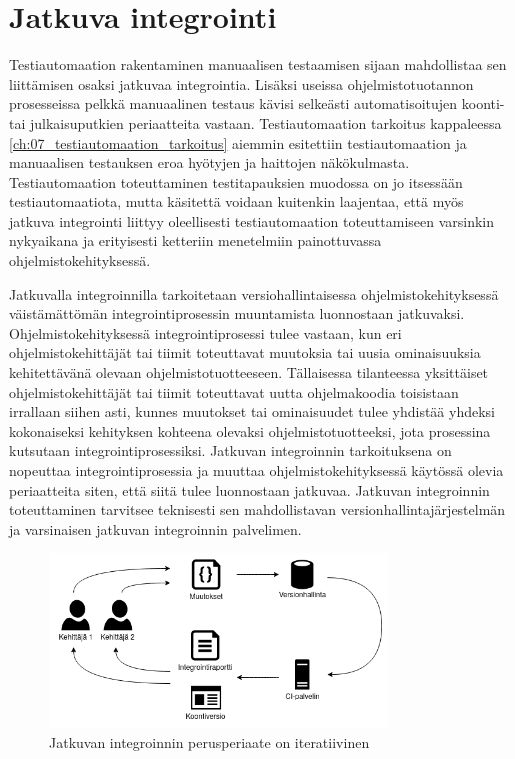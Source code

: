 \section{Jatkuva integrointi} \label{ch:07_jatkuva_integrointi}

  Testiautomaation rakentaminen manuaalisen testaamisen sijaan mahdollistaa sen liittämisen osaksi jatkuvaa integrointia.
  Lisäksi useissa ohjelmistotuotannon prosesseissa pelkkä manuaalinen testaus kävisi selkeästi automatisoitujen koonti- tai julkaisuputkien periaatteita vastaan.
  Testiautomaation tarkoitus kappaleessa \ref{ch:07_testiautomaation_tarkoitus} aiemmin esitettiin testiautomaation ja manuaalisen testauksen eroa hyötyjen ja haittojen näkökulmasta.
  Testiautomaation toteuttaminen testitapauksien muodossa on jo itsessään testiautomaatiota, mutta käsitettä voidaan kuitenkin laajentaa, että myös jatkuva integrointi liittyy oleellisesti testiautomaation toteuttamiseen varsinkin nykyaikana ja erityisesti ketteriin menetelmiin painottuvassa ohjelmistokehityksessä.

  Jatkuvalla integroinnilla tarkoitetaan versiohallintaisessa ohjelmistokehityksessä väistämättömän integrointiprosessin muuntamista luonnostaan jatkuvaksi.
  Ohjelmistokehityksessä integrointiprosessi tulee vastaan, kun eri ohjelmistokehittäjät tai tiimit toteuttavat muutoksia tai uusia ominaisuuksia kehitettävänä olevaan ohjelmistotuotteeseen.
  Tällaisessa tilanteessa yksittäiset ohjelmistokehittäjät tai tiimit toteuttavat uutta ohjelmakoodia toisistaan irrallaan siihen asti, kunnes muutokset tai ominaisuudet tulee yhdistää yhdeksi kokonaiseksi kehityksen kohteena olevaksi ohjelmistotuotteeksi, jota prosessina kutsutaan integrointiprosessiksi.
  Jatkuvan integroinnin tarkoituksena on nopeuttaa integrointiprosessia ja muuttaa ohjelmistokehityksessä käytössä olevia periaatteita siten, että siitä tulee luonnostaan jatkuvaa.
  Jatkuvan integroinnin toteuttaminen tarvitsee teknisesti sen mahdollistavan versionhallintajärjestelmän ja varsinaisen jatkuvan integroinnin palvelimen.

  \begin{figure}[H]
    \centering
    \includegraphics[width=0.8\textwidth]{assets/jatkuva-integrointi.png}
    \caption{Jatkuvan integroinnin perusperiaate on iteratiivinen}
    \label{fig:jatkuva-integrointi}
  \end{figure}

